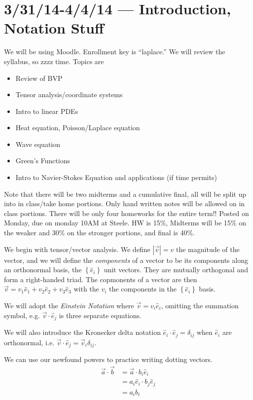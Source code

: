 \documentclass[10pt]{report}
\newcommand{\abs}[1]{\left|#1\right|}
\begin{document}
\chapter{3/31/14-4/4/14 --- Introduction, Notation Stuff} 

We will be using Moodle. Enrollment key is ``laplace.'' We will review the syllabus, so zzzz time. Topics are
\begin{itemize}
    \item Review of BVP
    \item Tensor analysis/coordinate systems
    \item Intro to linear PDEs
    \item Heat equation, Poisson/Laplace equation
    \item Wave equation
    \item Green's Functions
    \item Intro to Navier-Stokes Equation and applications (if time permits)
\end{itemize}

Note that there will be two midterms and a cumulative final, all will be split up into in class/take home portions. Only hand written notes will be allowed on in class portions. There will be only four homeworks for the entire term!! Posted on Monday, due on monday 10AM at Steele. HW is 15\%, Midterms will be 15\% on the weaker and 30\% on the stronger portions, and final is 40\%.


We begin with tensor/vector analysis. We define $\abs{\vec{v}} = v$ the magnitude of the vector, and we will define the \emph{components} of a vector to be its components along an orthonormal basis, the $\left\{ \hat{e}_i \right\}$ unit vectors. They are mutually orthogonal and form a right-handed triad. The copmonents of a vector are then $\vec{v} = v_1\hat{e}_1 + v_2\hat{e}_2 + v_3\hat{e}_3$ with the $v_i$ the components in the $\left\{ \hat{e}_i \right\}$ basis.

We will adopt the \emph{Einstein Notation} where $\vec{v} = v_i\hat{e}_i$, omitting the summation symbol, e.g. $\vec{v}\cdot \hat{e}_j$ is three separate equations.

We will also introduce the Kronecker delta notation $\hat{e}_i \cdot \hat{e}_j = \delta_{ij}$ when $\hat{e}_i$ are orthonormal, i.e. $\vec{v}\cdot \hat{e}_j = \vec{v}_i\delta_{ij}$.

We can use our newfound powers to practice writing dotting vectors. 
\begin{align}
    \vec{a}\cdot \vec{b} &= \vec{a}\cdot b_i\hat{e}_i\\
    &= a_i\hat{e}_i\cdot b_j\hat{e}_j\\
    &= a_ib_i
\end{align}
\end{document}
